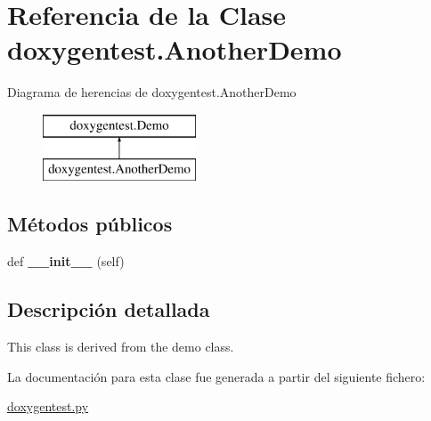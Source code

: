 \hypertarget{classdoxygentest_1_1_another_demo}{}\section{Referencia de la Clase doxygentest.\+Another\+Demo}
\label{classdoxygentest_1_1_another_demo}
Diagrama de herencias de doxygentest.\+Another\+Demo\begin{figure}[H]
\begin{center}
\leavevmode
\includegraphics[height=2.000000cm]{classdoxygentest_1_1_another_demo}
\end{center}
\end{figure}
\subsection*{Métodos públicos}
\begin{DoxyCompactItemize}
\item 
\mbox{\label{classdoxygentest_1_1_another_demo_a94a7a2529c931f052d664284c4a3b92c}} 
def {\bfseries \+\_\+\+\_\+init\+\_\+\+\_\+} (self)
\end{DoxyCompactItemize}


\subsection{Descripción detallada}
\begin{DoxyVerb}\brief This class is derived from the demo class.\end{DoxyVerb}
 

La documentación para esta clase fue generada a partir del siguiente fichero\+:\begin{DoxyCompactItemize}
\item 
\hyperlink{doxygentest_8py}{doxygentest.\+py}\end{DoxyCompactItemize}
